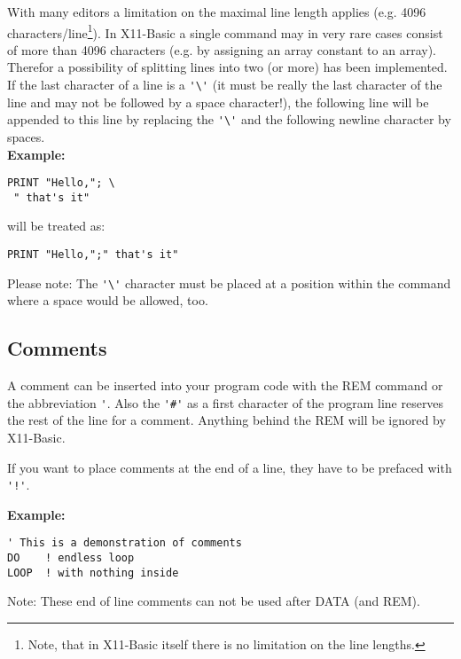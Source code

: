 With many editors a limitation on the maximal line length applies (e.g. 4096
characters/line\footnote{Note, that in X11-Basic itself there is no limitation
on the line lengths.}). In X11-Basic a single command may in very rare cases
consist of more than 4096 characters (e.g. by assigning an array constant to an
array). Therefor a possibility of splitting lines into two (or more) has been
implemented. If the last character of a line is a \verb|'\'| (it must be really
the last character of the line and may not be followed by a space character!),
the following line will be appended to this line by replacing the \verb|'\'|
and the following newline character by spaces.\\ {\bf Example:} 
\begin{mdframed}[hidealllines=true,backgroundcolor=blue!20]
\begin{verbatim}
PRINT "Hello,"; \
 " that's it" 
\end{verbatim}
\end{mdframed}
 will be treated as:
\begin{mdframed}[hidealllines=true,backgroundcolor=blue!20]
\begin{verbatim} 
PRINT "Hello,";" that's it" 
\end{verbatim}
\end{mdframed}

Please note: The \verb|'\'| character must be placed at a position within the
command where a space would be allowed, too.

\subsection*{Comments}

A comment can be inserted into your program code with the REM command or the
abbreviation \verb|'|. Also the \verb|'#'| as a first character of the program
line reserves the rest of the line for a comment. Anything behind the REM will
be ignored by X11-Basic.

If you want to place comments at the end of a line, they have to be
prefaced with \verb|'!'|.\\
\begin{mdframed}[hidealllines=true,backgroundcolor=blue!20]
{\bf Example:}
\begin{verbatim}
' This is a demonstration of comments
DO    ! endless loop
LOOP  ! with nothing inside
\end{verbatim}
\end{mdframed}
Note: These end of line comments can not be used after DATA (and REM).

